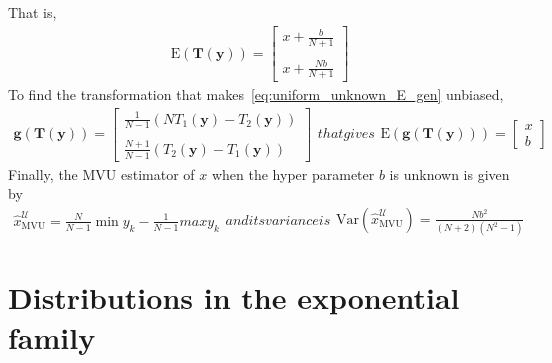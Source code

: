 \documentclass[journal]{IEEEtran}
\newcommand{\E}{\mathrm{E}}
\newcommand{\Var}{\mathrm{Var}}
\begin{document}
%
%
That is, 
%
%
\begin{align}
\E(\bm{T}(\bm{y})) = \begin{bmatrix}
x+\frac{b}{N+1}\\\\x+\frac{Nb}{N+1}
\end{bmatrix}
\label{eq:uniform_unknown_E_gen}
\end{align}
%
%
To find the transformation that makes~\eqref{eq:uniform_unknown_E_gen} unbiased, 
%
%
\begin{subequations}
	\begin{align}
	\bm{g}(\bm{T}(\bm{y}))=\begin{bmatrix}\frac{1}{N-1}\left(NT_1(\bm{y})-T_2(\bm{y})\right)\\\\	\frac{N+1}{N-1}\left(T_2(\bm{y})-T_1(\bm{y})\right)\end{bmatrix}
	\end{align}
	that gives
	\begin{align}
	\E\left(\bm{g}(\bm{T}(\bm{y}))\right) = \begin{bmatrix}x\\b	\end{bmatrix}
	\end{align}
\end{subequations}
Finally, the MVU estimator of $x$ when the hyper parameter $b$ is unknown is given by
\begin{subequations}
	\begin{align}
	\hat{x}_{\mathrm{MVU}}^{\mathcal{U}} = \frac{N}{N-1}\min y_k - \frac{1}{N-1} max y_k 
	\end{align}
	and its variance is
	\begin{align}
	\Var(\hat{x}_{\mathrm{MVU}}^{\mathcal{U}}) = \frac{Nb^2}{(N+2)(N^2-1)}
	\end{align}
\end{subequations}
%
%


\section{Distributions in the exponential family} \label{sec:distributioons_in_the_exponential_family}
\end{document}
